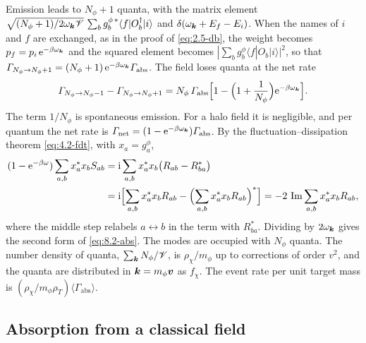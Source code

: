 Emission leads to $N_\phi + 1$ quanta, with the matrix element $\sqrt{(N_\phi+1)/2\omega_{\bm{k}}\mathscr{V}}\,\sum_bg^{\phi\,*}_b\langle f|O_b^\dagger|i\rangle$ and $\delta(\omega_{\bm{k}} + E_f - E_i)$. When the names of $i$ and $f$ are exchanged, as in the proof of \cref{eq:2.5-db}, the weight becomes $p_f = p_i\,\mathrm{e}^{-\beta\omega_{\bm{k}}}$ and the squared element becomes $|\sum_bg^\phi_b\langle f|O_b|i\rangle|^2$, so that $\varGamma_{N_\phi\to N_\phi+1} = (N_\phi + 1)\,\mathrm{e}^{-\beta\omega_{\bm{k}}}\varGamma_{\mathrm{abs}}$. The field loses quanta at the net rate
\begin{equation*}
  \varGamma_{N_\phi\to N_\phi-1} - \varGamma_{N_\phi\to N_\phi+1} = N_\phi\,\varGamma_{\mathrm{abs}}\Bigl[1 - \Bigl(1 + \frac{1}{N_\phi}\Bigr)\mathrm{e}^{-\beta\omega_{\bm{k}}}\Bigr] .
\end{equation*}
The term $1/N_\phi$ is spontaneous emission. For a halo field it is negligible, and per quantum the net rate is $\varGamma_{\mathrm{net}} = (1 - \mathrm{e}^{-\beta\omega_{\bm{k}}})\varGamma_{\mathrm{abs}}$. By the fluctuation--dissipation theorem \cref{eq:4.2-fdt}, with $x_a = g^\phi_a$,
\begin{equation*}
  \begin{aligned}
  (1 - \mathrm{e}^{-\beta\omega})\sum_{a,b}x_a^*x_bS_{ab} &= \mathrm{i}\sum_{a,b}x_a^*x_b\bigl(R_{ab} - R_{ba}^*\bigr) \\
  &= \mathrm{i}\Bigl[\sum_{a,b}x_a^*x_bR_{ab} - \Bigl(\sum_{a,b}x_a^*x_bR_{ab}\Bigr)^*\Bigr] = -2\,\operatorname{Im}\sum_{a,b}x_a^*x_bR_{ab} ,
  \end{aligned}
\end{equation*}
where the middle step relabels $a \leftrightarrow b$ in the term with $R_{ba}^*$. Dividing by $2\omega_{\bm{k}}$ gives the second form of \cref{eq:8.2-abs}. The modes are occupied with $N_\phi$ quanta. The number density of quanta, $\sum_{\bm{k}}N_\phi/\mathscr{V}$, is $\rho_\chi/m_\phi$ up to corrections of order $v^2$, and the quanta are distributed in $\bm{k} = m_\phi\bm{v}$ as $f_\chi$. The event rate per unit target mass is $(\rho_\chi/m_\phi\rho_T)\langle\varGamma_{\mathrm{abs}}\rangle$.

\subsection{Absorption from a classical field}

